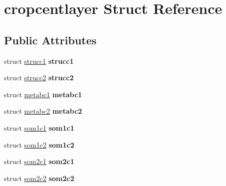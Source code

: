 \hypertarget{structcropcentlayer}{\section{cropcentlayer Struct Reference}
\label{structcropcentlayer}
}
\subsection*{Public Attributes}
\begin{DoxyCompactItemize}
\item 
\hypertarget{structcropcentlayer_a6c20601da0920addb140fca9c0d37e2e}{struct \hyperlink{structstrucc1}{strucc1} {\bfseries strucc1}}\label{structcropcentlayer_a6c20601da0920addb140fca9c0d37e2e}

\item 
\hypertarget{structcropcentlayer_aadd309fa7f179d3fc8256fe9cb1500d8}{struct \hyperlink{structstrucc2}{strucc2} {\bfseries strucc2}}\label{structcropcentlayer_aadd309fa7f179d3fc8256fe9cb1500d8}

\item 
\hypertarget{structcropcentlayer_a256d4a71b9934ad34663c9363111fe0c}{struct \hyperlink{structmetabc1}{metabc1} {\bfseries metabc1}}\label{structcropcentlayer_a256d4a71b9934ad34663c9363111fe0c}

\item 
\hypertarget{structcropcentlayer_a700d2b1a89f270805d882552c210ac18}{struct \hyperlink{structmetabc2}{metabc2} {\bfseries metabc2}}\label{structcropcentlayer_a700d2b1a89f270805d882552c210ac18}

\item 
\hypertarget{structcropcentlayer_ac67a81076256e2e4a62319d382ef9b5e}{struct \hyperlink{structsom1c1}{som1c1} {\bfseries som1c1}}\label{structcropcentlayer_ac67a81076256e2e4a62319d382ef9b5e}

\item 
\hypertarget{structcropcentlayer_ab13c66b29bcbdc1be2bb4fd91c99dff3}{struct \hyperlink{structsom1c2}{som1c2} {\bfseries som1c2}}\label{structcropcentlayer_ab13c66b29bcbdc1be2bb4fd91c99dff3}

\item 
\hypertarget{structcropcentlayer_a714197419b2fde7d71f392c55192d0df}{struct \hyperlink{structsom2c1}{som2c1} {\bfseries som2c1}}\label{structcropcentlayer_a714197419b2fde7d71f392c55192d0df}

\item 
\hypertarget{structcropcentlayer_ad29e0056d32f892603cdfd382fd866d5}{struct \hyperlink{structsom2c2}{som2c2} {\bfseries som2c2}}\label{structcropcentlayer_ad29e0056d32f892603cdfd382fd866d5}


\end{DoxyCompactItemize}
